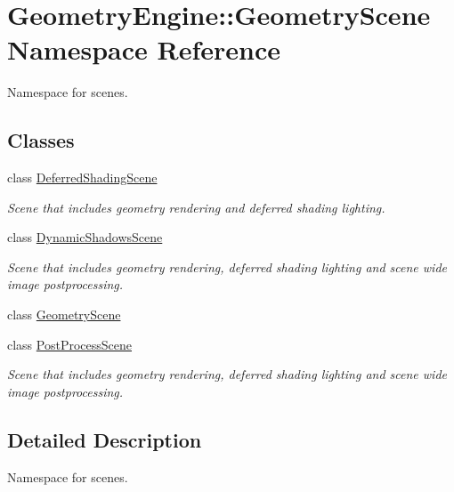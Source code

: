 \hypertarget{namespace_geometry_engine_1_1_geometry_scene}{}\section{Geometry\+Engine\+::Geometry\+Scene Namespace Reference}
\label{namespace_geometry_engine_1_1_geometry_scene}


Namespace for scenes.  


\subsection*{Classes}
\begin{DoxyCompactItemize}
\item 
class \mbox{\hyperlink{class_geometry_engine_1_1_geometry_scene_1_1_deferred_shading_scene}{Deferred\+Shading\+Scene}}
\begin{DoxyCompactList}\small\item\em Scene that includes geometry rendering and deferred shading lighting. \end{DoxyCompactList}\item 
class \mbox{\hyperlink{class_geometry_engine_1_1_geometry_scene_1_1_dynamic_shadows_scene}{Dynamic\+Shadows\+Scene}}
\begin{DoxyCompactList}\small\item\em Scene that includes geometry rendering, deferred shading lighting and scene wide image postprocessing. \end{DoxyCompactList}\item 
class \mbox{\hyperlink{class_geometry_engine_1_1_geometry_scene_1_1_geometry_scene}{Geometry\+Scene}}
\item 
class \mbox{\hyperlink{class_geometry_engine_1_1_geometry_scene_1_1_post_process_scene}{Post\+Process\+Scene}}
\begin{DoxyCompactList}\small\item\em Scene that includes geometry rendering, deferred shading lighting and scene wide image postprocessing. \end{DoxyCompactList}\end{DoxyCompactItemize}


\subsection{Detailed Description}
Namespace for scenes. 